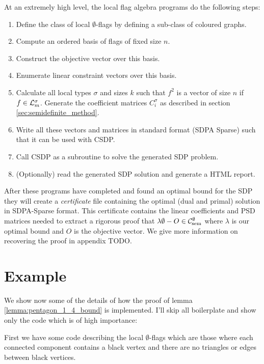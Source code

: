 \noindent At an extremely high level, the local flag algebra programs do the following steps:
\begin{enumerate}
    \item Define the class of local $\emptyset$-flags by defining a sub-class of
        coloured graphs.
    \item Compute an ordered basis of flags of fixed size $n$.
    \item Construct the objective vector over this basis.
    \item Enumerate linear constraint vectors over this basis.
    \item Calculate all local types $\sigma$ and sizes $k$ such that $f^2$ is a vector
        of size $n$ if $f \in \mathcal{L}^\sigma_m$. Generate the coefficient matrices
        $C^\sigma_i$ as described in section \ref{sec:semidefinite_method}.
    \item Write all these vectors and matrices in standard format (SDPA Sparse) such that it
        can be used with CSDP.
    \item Call CSDP as a subroutine to solve the generated SDP problem.
    \item (Optionally) read the generated SDP solution and generate a HTML report.
\end{enumerate}

After these programs have completed and found an optimal bound for the SDP
they will create a \textit{certificate} file containing the optimal (dual and primal)
solution in SDPA-Sparse format. This certificate contains the linear coefficients
and PSD matrices needed to extract a rigorous proof that $\lambda\emptyset - O\in\mathcal{C}_\mathrm{sem}^\emptyset$
where $\lambda$ is our optimal bound and $O$ is the objective vector. We give more
information on recovering the proof in appendix TODO.

\section*{Example}

We show now some of the details of how the proof of lemma \ref{lemma:pentagon_1_4_bound}
is implemented. I'll skip all boilerplate and show only the code which is of high
importance:

First we have some code describing the local $\emptyset$-flags which are those
where each connected component contains a black vertex and there are no
triangles or edges between black vertices.

